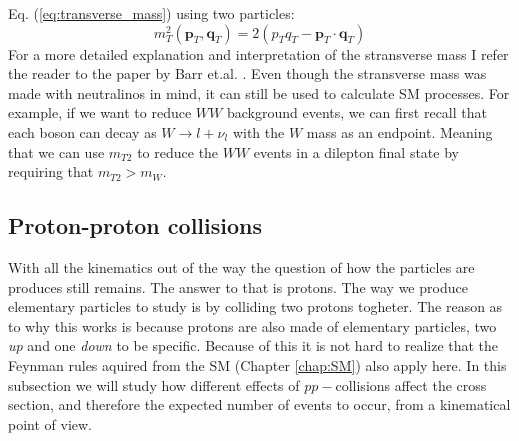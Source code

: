\documentclass[14pt, a4paper]{book}
\begin{document}
Eq. (\ref{eq:transverse_mass}) using two particles:
$$
m_T^2 \left(\mathbf{p}_T, \mathbf{q}_T\right) = 2(p_T q_T - \mathbf{p}_T\cdot\mathbf{q}_T)
$$
For a more detailed explanation and interpretation of the stransverse mass I refer the reader to the paper by Barr et.al. \cite{Barr_2003}. Even though the stransverse mass was made with neutralinos in mind, it can still 
be used to calculate SM processes. For example, if we want to reduce $WW$ background events, we can first recall that each boson can decay as $W\rightarrow l+\nu_l$ with the $W$ mass as an endpoint. 
Meaning that we can use $m_{T2}$ to reduce the $WW$ events in a dilepton final state by requiring that $m_{T2} > m_W$.

\clearpage
\subsection{Proton-proton collisions}
With all the kinematics out of the way the question of how the particles are produces still remains. The answer to that is protons. The way we produce elementary particles to study is by colliding two protons togheter.
The reason as to why this works is because protons are also made of elementary particles, two \textit{up} and one \textit{down} to be specific.
Because of this it is not hard to realize that the Feynman rules aquired from the SM (Chapter \ref{chap:SM}) also apply here. In this subsection we will study how different effects of $pp-$collisions affect 
the cross section, and therefore the expected number of events to occur, from a kinematical point of view.
\end{document}
